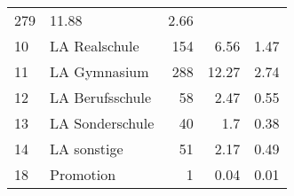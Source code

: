 \begin{longtable}{lXrrr}
       \num{279} &
       \num[round-mode=places,round-precision=2]{11,88} &
         \num[round-mode=places,round-precision=2]{2,66} \\

     10 &
     \multicolumn{1}{X}{ LA Realschule   } &


       \num{154} &
       \num[round-mode=places,round-precision=2]{6,56} &
         \num[round-mode=places,round-precision=2]{1,47} \\

     11 &
     \multicolumn{1}{X}{ LA Gymnasium   } &


       \num{288} &
       \num[round-mode=places,round-precision=2]{12,27} &
         \num[round-mode=places,round-precision=2]{2,74} \\

     12 &
     \multicolumn{1}{X}{ LA Berufsschule   } &


       \num{58} &
       \num[round-mode=places,round-precision=2]{2,47} &
         \num[round-mode=places,round-precision=2]{0,55} \\

     13 &
     \multicolumn{1}{X}{ LA Sonderschule   } &


       \num{40} &
       \num[round-mode=places,round-precision=2]{1,7} &
         \num[round-mode=places,round-precision=2]{0,38} \\

     14 &
     \multicolumn{1}{X}{ LA sonstige   } &


       \num{51} &
       \num[round-mode=places,round-precision=2]{2,17} &
         \num[round-mode=places,round-precision=2]{0,49} \\

     18 &
     \multicolumn{1}{X}{ Promotion   } &


       \num{1} &
       \num[round-mode=places,round-precision=2]{0,04} &
         \num[round-mode=places,round-precision=2]{0,01} \\


\end{longtable}
